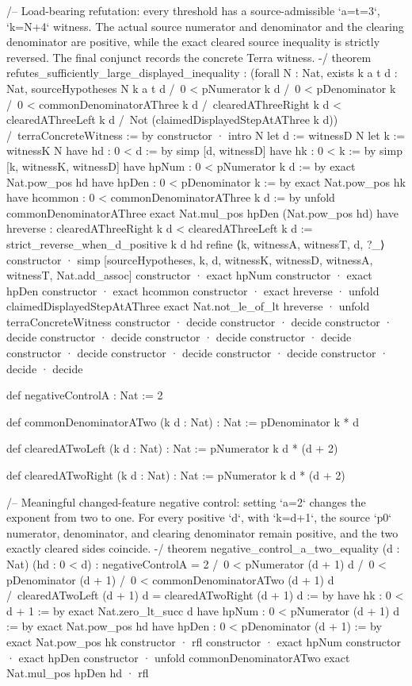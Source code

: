 \documentclass[11pt]{article}
\begin{document}
\begin{Vlean}
/-- Load-bearing refutation: every threshold has a source-admissible
`a=t=3`, `k=N+4` witness. The actual source numerator and denominator and the
clearing denominator are positive, while the exact cleared source inequality
is strictly reversed. The final conjunct records the concrete Terra witness. -/
theorem refutes_sufficiently_large_displayed_inequality :
    (forall N : Nat, exists k a t d : Nat,
      sourceHypotheses N k a t d /\
      0 < pNumerator k d /\
      0 < pDenominator k /\
      0 < commonDenominatorAThree k d /\
      clearedAThreeRight k d < clearedAThreeLeft k d /\
      Not (claimedDisplayedStepAtAThree k d)) /\
    terraConcreteWitness := by
  constructor
  · intro N
    let d := witnessD N
    let k := witnessK N
    have hd : 0 < d := by
      simp [d, witnessD]
    have hk : 0 < k := by
      simp [k, witnessK, witnessD]
    have hpNum : 0 < pNumerator k d := by
      exact Nat.pow_pos hd
    have hpDen : 0 < pDenominator k := by
      exact Nat.pow_pos hk
    have hcommon : 0 < commonDenominatorAThree k d := by
      unfold commonDenominatorAThree
      exact Nat.mul_pos hpDen (Nat.pow_pos hd)
    have hreverse :
        clearedAThreeRight k d < clearedAThreeLeft k d :=
      strict_reverse_when_d_positive k d hd
    refine ⟨k, witnessA, witnessT, d, ?_⟩
    constructor
    · simp [sourceHypotheses, k, d, witnessK, witnessD,
        witnessA, witnessT, Nat.add_assoc]
    constructor
    · exact hpNum
    constructor
    · exact hpDen
    constructor
    · exact hcommon
    constructor
    · exact hreverse
    · unfold claimedDisplayedStepAtAThree
      exact Nat.not_le_of_lt hreverse
  · unfold terraConcreteWitness
    constructor
    · decide
    constructor
    · decide
    constructor
    · decide
    constructor
    · decide
    constructor
    · decide
    constructor
    · decide
    constructor
    · decide
    constructor
    · decide
    constructor
    · decide
    constructor
    · decide
    · decide

def negativeControlA : Nat := 2

def commonDenominatorATwo (k d : Nat) : Nat :=
  pDenominator k * d

def clearedATwoLeft (k d : Nat) : Nat :=
  pNumerator k d * (d + 2)

def clearedATwoRight (k d : Nat) : Nat :=
  pNumerator k d * (d + 2)

/-- Meaningful changed-feature negative control: setting `a=2` changes the
exponent from two to one. For every positive `d`, with `k=d+1`, the source
`p0` numerator, denominator, and clearing denominator remain positive, and
the two exactly cleared sides coincide. -/
theorem negative_control_a_two_equality
    (d : Nat) (hd : 0 < d) :
    negativeControlA = 2 /\
    0 < pNumerator (d + 1) d /\
    0 < pDenominator (d + 1) /\
    0 < commonDenominatorATwo (d + 1) d /\
    clearedATwoLeft (d + 1) d = clearedATwoRight (d + 1) d := by
  have hk : 0 < d + 1 := by
    exact Nat.zero_lt_succ d
  have hpNum : 0 < pNumerator (d + 1) d := by
    exact Nat.pow_pos hd
  have hpDen : 0 < pDenominator (d + 1) := by
    exact Nat.pow_pos hk
  constructor
  · rfl
  constructor
  · exact hpNum
  constructor
  · exact hpDen
  constructor
  · unfold commonDenominatorATwo
    exact Nat.mul_pos hpDen hd
  · rfl


\end{Vlean}
\end{document}
